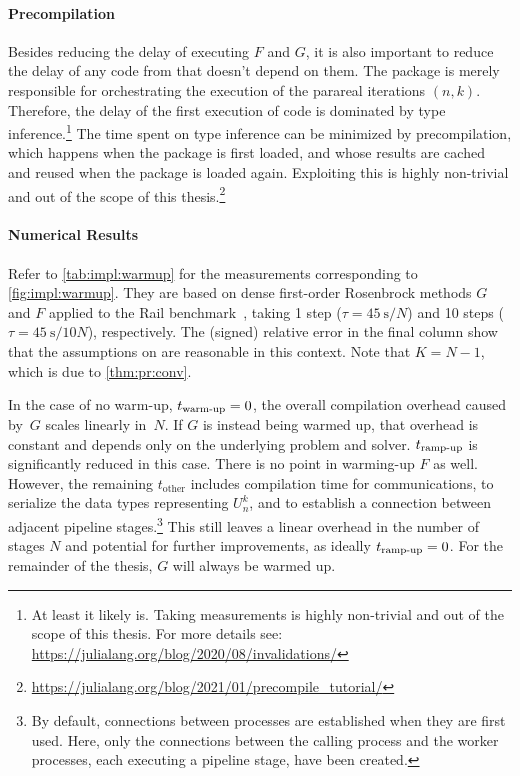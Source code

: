 \paragraph{Precompilation}

Besides reducing the delay of executing $F$ and $G$,
it is also important to reduce the delay of any code from  that doesn't depend on them.
The package is merely responsible for orchestrating the execution of the parareal iterations $(n,k)$.
Therefore, the delay of the first execution of  code is dominated by type inference.\footnote{%
  At least it likely is. Taking measurements is highly non-trivial and out of the scope of this thesis.
  For more details see: \url{https://julialang.org/blog/2020/08/invalidations/}
}
The time spent on type inference can be minimized by precompilation,
which happens when the package is first loaded,
and whose results are cached and reused when the package is loaded again.
Exploiting this is highly non-trivial and out of the scope of this thesis.\footnote{\url{https://julialang.org/blog/2021/01/precompile_tutorial/}}

\paragraph{Numerical Results}

Refer to \autoref{tab:impl:warmup} for the measurements corresponding to \autoref{fig:impl:warmup}.
They are based on dense first-order Rosenbrock methods $G$ and $F$ applied to the Rail benchmark~\cite{morwiki_steel},
taking 1 step ($\tau=\SI{45}{\second}/N$) and 10 steps ($\tau=\SI{45}{\second}/10N$), respectively.
The (signed) relative error in the final column show that the assumptions on  are reasonable in this context.
Note that $K=N-1$, which is due to \autoref{thm:pr:conv}.

In the case of no warm-up, $t_\text{warm-up}=0$, the overall compilation overhead caused by~$G$ scales linearly in~$N$.
If $G$ is instead being warmed up,
that overhead is constant and depends only on the underlying problem and solver.
$t_\text{ramp-up}$ is significantly reduced in this case.
There is no point in warming-up $F$ as well.
However, the remaining $t_\text{other}$ includes compilation time for communications,
\eg to serialize the data types representing $U_n^k$,
and to establish a connection between adjacent pipeline stages.\footnote{%
  By default, connections between processes are established when they are first used.
  Here, only the connections between the calling process and the worker processes,
  each executing a pipeline stage,
  have been created.
}
This still leaves a linear overhead in the number of stages $N$
and potential for further improvements,
as ideally $t_\text{ramp-up}=0$.
For the remainder of the thesis, $G$ will always be warmed up.

